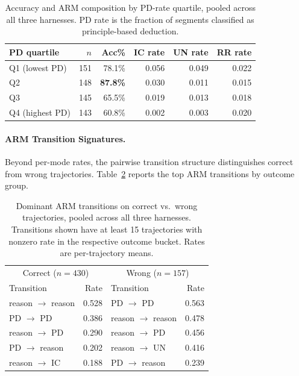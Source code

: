 \begin{table}[t]
\centering
\caption{Accuracy and ARM composition by PD-rate quartile, pooled across all three harnesses. PD rate is the fraction of segments classified as principle-based deduction.}
\label{tab:arm-pd-quartile}
\small
\begin{tabular}{lrrrrr}
\toprule
PD quartile & $n$ & Acc\% & IC rate & UN rate & RR rate \\
\midrule
Q1 (lowest PD) & 151 & 78.1\% & 0.056 & 0.049 & 0.022 \\
Q2            & 148 & \textbf{87.8\%} & 0.030 & 0.011 & 0.015 \\
Q3            & 145 & 65.5\% & 0.019 & 0.013 & 0.018 \\
Q4 (highest PD) & 143 & 60.8\% & 0.002 & 0.003 & 0.020 \\
\bottomrule
\end{tabular}
\end{table}

\paragraph{ARM Transition Signatures.}
Beyond per-mode rates, the pairwise transition structure distinguishes correct from wrong trajectories. Table~\ref{tab:arm-transitions} reports the top ARM transitions by outcome group.

\begin{table}[t]
\centering
\caption{Dominant ARM transitions on correct vs.\ wrong trajectories, pooled across all three harnesses. Transitions shown have at least 15 trajectories with nonzero rate in the respective outcome bucket. Rates are per-trajectory means.}
\label{tab:arm-transitions}
\small
\begin{tabular}{lrlr}
\toprule
\multicolumn{2}{c}{Correct ($n{=}430$)} & \multicolumn{2}{c}{Wrong ($n{=}157$)} \\
Transition & Rate & Transition & Rate \\
\midrule
reason $\to$ reason & 0.528 & PD $\to$ PD & 0.563 \\
PD $\to$ PD & 0.386 & reason $\to$ reason & 0.478 \\
reason $\to$ PD & 0.290 & reason $\to$ PD & 0.456 \\
PD $\to$ reason & 0.202 & reason $\to$ UN & 0.416 \\
reason $\to$ IC & 0.188 & PD $\to$ reason & 0.239 \\
\bottomrule
\end{tabular}
\end{table}

